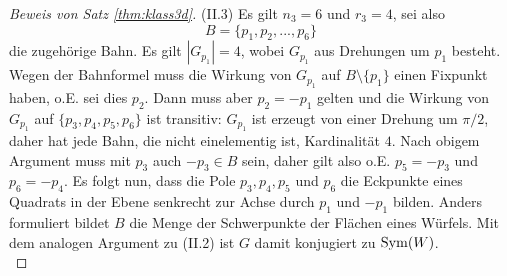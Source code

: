 \documentclass{book}
\begin{document}
\begin{proof}[Beweis von Satz \ref{thm:klass3d}]
    \noindent
    (II.3) Es gilt $n_3 = 6$ und $r_3 = 4$, sei also
    \[
        B = \{p_1, p_2, ... , p_6\}
    \]
    die zugehörige Bahn. Es gilt $|G_{p_1}| = 4$, wobei $G_{p_1}$ aus Drehungen
    um $p_1$ besteht. Wegen der Bahnformel muss die Wirkung von $G_{p_1}$ auf
    $B \setminus \{p_1\}$ einen Fixpunkt haben, o.E. sei dies $p_2$. Dann muss
    aber $p_2 = -p_1$ gelten und die Wirkung von $G_{p_1}$ auf $\{p_3, p_4,
    p_5, p_6\}$ ist transitiv: $G_{p_1}$ ist erzeugt von einer Drehung um
    $\pi/2$, daher hat jede Bahn, die nicht einelementig ist, Kardinalität $4$.
    Nach obigem Argument muss mit $p_3$ auch $-p_3 \in B$ sein, daher gilt also
    o.E. $p_5= -p_3$ und $p_6 = -p_4$. Es folgt nun, dass die Pole
    $p_3,p_4,p_5$ und $p_6$ die Eckpunkte eines Quadrats in der Ebene senkrecht
    zur Achse durch $p_1$ und $-p_1$ bilden. Anders formuliert bildet $B$ die
    Menge der Schwerpunkte der Flächen eines Würfels. Mit dem analogen Argument
    zu (II.2) ist $G$ damit konjugiert zu $\operatorname{Sym}(W)$.\\


\end{proof}
\end{document}
